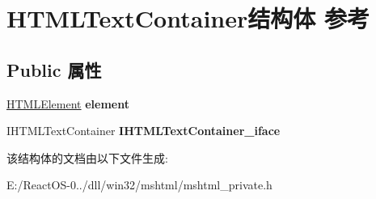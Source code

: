 \hypertarget{struct_h_t_m_l_text_container}{}\section{H\+T\+M\+L\+Text\+Container结构体 参考}
\label{struct_h_t_m_l_text_container}
\subsection*{Public 属性}
\begin{DoxyCompactItemize}
\item 
\mbox{\label{struct_h_t_m_l_text_container_a5f4cbdd1b89c3b0a324834d6df8ade37}} 
\hyperlink{struct_h_t_m_l_element}{H\+T\+M\+L\+Element} {\bfseries element}
\item 
\mbox{\label{struct_h_t_m_l_text_container_ab2bfaaf5e114d0bc8e1b702746851242}} 
I\+H\+T\+M\+L\+Text\+Container {\bfseries I\+H\+T\+M\+L\+Text\+Container\+\_\+iface}
\end{DoxyCompactItemize}


该结构体的文档由以下文件生成\+:\begin{DoxyCompactItemize}
\item 
E\+:/\+React\+O\+S-\/0../dll/win32/mshtml/mshtml\+\_\+private.\+h\end{DoxyCompactItemize}
